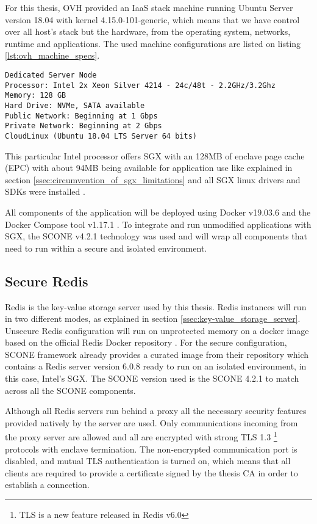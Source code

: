 For this thesis, OVH provided an IaaS stack machine running Ubuntu Server version 18.04 with kernel 4.15.0-101-generic, which means that we have control over all host's stack but the hardware, from the operating system, networks, runtime and applications. The used machine configurations are listed on listing \ref{lst:ovh_machine_specs}.

\lstset{numbers=none, caption=Machine Specifications, label=lst:machine_specs}
\label{lst:ovh_machine_specs}
\begin{lstlisting}
Dedicated Server Node
Processor: Intel 2x Xeon Silver 4214 - 24c/48t - 2.2GHz/3.2Ghz
Memory: 128 GB
Hard Drive: NVMe, SATA available
Public Network: Beginning at 1 Gbps
Private Network: Beginning at 2 Gbps
CloudLinux (Ubuntu 18.04 LTS Server 64 bits)
\end{lstlisting}

This particular Intel processor offers \gls{SGX} with an 128\gls{MB} of enclave page cache (\gls{EPC}) with about 94\gls{MB} being available for application use like explained in section \ref{ssec:circumvention_of_sgx_limitations} and all \gls{SGX} linux drivers and \glspl{SDK} were installed \cite{sgx_drivers:1, sgx_sdk:1}.

All components of the application will be deployed using Docker v19.03.6 \cite{docker:1} and the Docker Compose tool v1.17.1 \cite{docker-compose:1}. To integrate and run unmodified applications with \gls{SGX}, the SCONE v4.2.1 \cite{scone:1} technology was used and will wrap all components that need to run within a secure and isolated environment.

\subsection{Secure Redis}
\label{ssec:secure_redis}

Redis \cite{redis:1} is the key-value storage server used by this thesis. Redis instances will run in two different modes, as explained in section \ref{ssec:key-value_storage_server}. Unsecure Redis configuration will run on unprotected memory on a docker image based on the official Redis Docker repository \cite{redis:6}. For the secure configuration, SCONE framework already provides a curated image from their repository which contains a Redis server version 6.0.8 ready to run on an isolated environment, in this case, Intel's SGX. The SCONE version used is the SCONE 4.2.1 to match across all the SCONE components.

Although all Redis servers run behind a proxy all the necessary security features provided natively by the server are used. Only communications incoming from the proxy server are allowed and all are encrypted with strong \gls{TLS} 1.3 \footnote{TLS is a new feature released in Redis v6.0} protocols with enclave termination. The non-encrypted communication port is disabled, and mutual \gls{TLS} authentication is turned on, which means that all clients are required to provide a certificate signed by the thesis CA in order to establish a connection.

